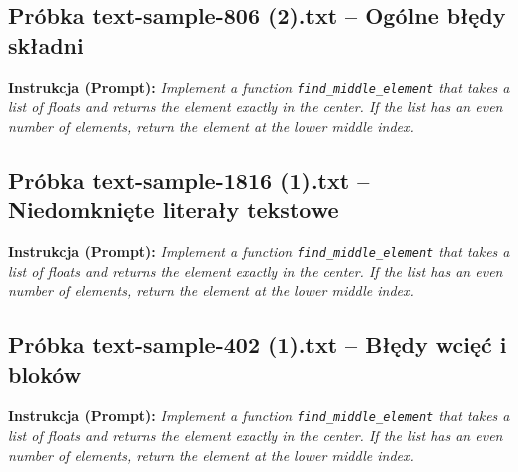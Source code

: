 

\subsection{Próbka text-sample-806 (2).txt -- Ogólne błędy składni}
\label{sec:lst:text-sample-806-2}
\textbf{Instrukcja (Prompt):} \textit{Implement a function \texttt{find\_middle\_element} that takes a list of floats and returns the element exactly in the center. If the list has an even number of elements, return the element at the lower middle index.}



\subsection{Próbka text-sample-1816 (1).txt -- Niedomknięte literały tekstowe}
\label{sec:lst:text-sample-1816-1}
\textbf{Instrukcja (Prompt):} \textit{Implement a function \texttt{find\_middle\_element} that takes a list of floats and returns the element exactly in the center. If the list has an even number of elements, return the element at the lower middle index.}



\subsection{Próbka text-sample-402 (1).txt -- Błędy wcięć i bloków}
\label{sec:lst:text-sample-402-1}
\textbf{Instrukcja (Prompt):} \textit{Implement a function \texttt{find\_middle\_element} that takes a list of floats and returns the element exactly in the center. If the list has an even number of elements, return the element at the lower middle index.}



